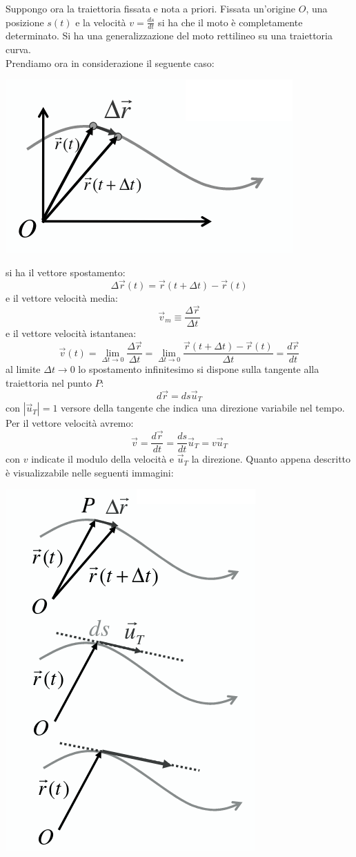 \documentclass[a4paper,12pt, oneside]{book}
\begin{document}
Suppongo ora la traiettoria fissata e nota a priori. Fissata un'origine $O$, una posizione $s(t)$ e la velocità $v=\frac{ds}{dt}$ si ha che il moto è completamente determinato. Si ha una generalizzazione del moto rettilineo su una traiettoria curva.\\
Prendiamo ora in considerazione il seguente caso:
\begin{center}
\includegraphics[scale=0.4]{img/pia3.png}
\end{center}
si ha il vettore spostamento:
$$\Delta\vec{r}(t)=\vec{r}(t+\Delta t)-\vec{r}(t)$$
e il vettore velocità media:
$$\vec{v}_m\equiv\frac{\Delta\vec{r}}{\Delta t}$$
e il vettore velocità istantanea:
$$\vec{v}(t)=\lim_{\Delta t\to 0}\frac{\Delta\vec{r}}{\Delta t}=\lim_{\Delta t\to 0}\frac{\vec{r}(t+\Delta t)-\vec{r}(t)}{\Delta t}=\frac{d\vec{r}}{dt}$$
al limite $\Delta t\to 0$ lo spostamento infinitesimo si dispone sulla tangente alla traiettoria nel punto $P$: 
$$d\vec{r}=ds\vec{u}_T$$
con $|\vec{u}_T|=1$ versore della tangente che indica una direzione variabile nel tempo. Per il vettore velocità avremo:
$$\vec{v}=\frac{d\vec{r}}{dt}=\frac{ds}{dt}\vec{u}_T=v\vec{u}_T$$
con $v$ indicate il modulo della velocità e $\vec{u}_T$ la direzione.
\newpage
 Quanto appena descritto è visualizzabile nelle seguenti immagini:
\begin{center}
\includegraphics[scale=0.4]{img/pia4.png}
\end{center}
\end{document}
